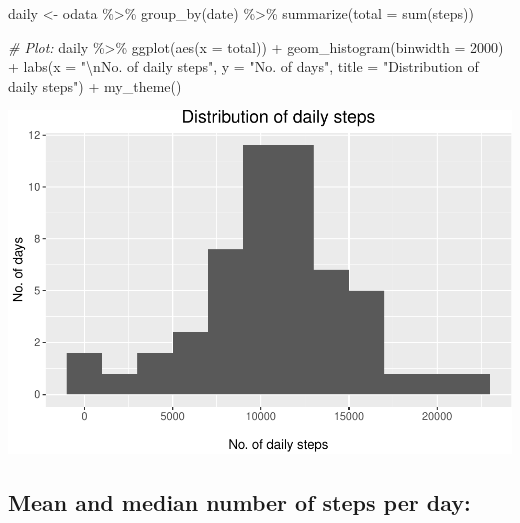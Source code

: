 \documentclass[
  paper=a4,
  ,captions=tableheading
]{scrartcl}
\newenvironment{Shaded}{\begin{snugshade}}{\end{snugshade}}
\newcommand{\AttributeTok}[1]{\textcolor[rgb]{0.77,0.63,0.00}{#1}}
\newcommand{\CommentTok}[1]{\textcolor[rgb]{0.56,0.35,0.01}{\textit{#1}}}
\newcommand{\ConstantTok}[1]{\textcolor[rgb]{0.00,0.00,0.00}{#1}}
\newcommand{\DecValTok}[1]{\textcolor[rgb]{0.00,0.00,0.81}{#1}}
\newcommand{\FunctionTok}[1]{\textcolor[rgb]{0.00,0.00,0.00}{#1}}
\newcommand{\NormalTok}[1]{#1}
\newcommand{\OtherTok}[1]{\textcolor[rgb]{0.56,0.35,0.01}{#1}}
\newcommand{\SpecialCharTok}[1]{\textcolor[rgb]{0.00,0.00,0.00}{#1}}
\newcommand{\StringTok}[1]{\textcolor[rgb]{0.31,0.60,0.02}{#1}}
\begin{document}
\begin{Shaded}
\begin{Highlighting}[]
\NormalTok{daily }\OtherTok{\textless{}{-}}\NormalTok{ odata }\SpecialCharTok{\%\textgreater{}\%}
    \FunctionTok{group\_by}\NormalTok{(date) }\SpecialCharTok{\%\textgreater{}\%} 
    \FunctionTok{summarize}\NormalTok{(}\AttributeTok{total =} \FunctionTok{sum}\NormalTok{(steps))}

\CommentTok{\# Plot:}
\NormalTok{daily }\SpecialCharTok{\%\textgreater{}\%}
  \FunctionTok{ggplot}\NormalTok{(}\FunctionTok{aes}\NormalTok{(}\AttributeTok{x =}\NormalTok{ total)) }\SpecialCharTok{+}
  \FunctionTok{geom\_histogram}\NormalTok{(}\AttributeTok{binwidth =} \DecValTok{2000}\NormalTok{) }\SpecialCharTok{+}
  \FunctionTok{labs}\NormalTok{(}\AttributeTok{x =} \StringTok{"}\SpecialCharTok{\textbackslash{}n}\StringTok{No. of daily steps"}\NormalTok{,}
       \AttributeTok{y =} \StringTok{"No. of days"}\NormalTok{,}
       \AttributeTok{title =} \StringTok{"Distribution of daily steps"}\NormalTok{) }\SpecialCharTok{+} 
  \FunctionTok{my\_theme}\NormalTok{()}
\end{Highlighting}
\end{Shaded}

\includegraphics{PA1_template_files/figure-latex/histo-1.pdf}

\hypertarget{mean-and-median-number-of-steps-per-day}{%
\subsection{Mean and median number of steps per
day:}\label{mean-and-median-number-of-steps-per-day}}

\begin{Shaded}
\end{Shaded}
\end{document}
